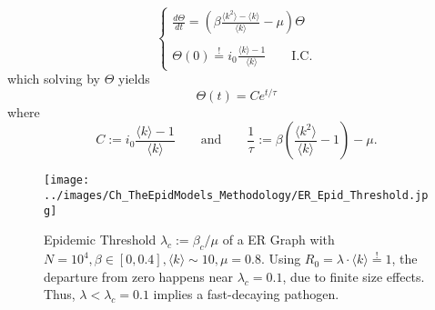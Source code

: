 \documentclass[a4paper,10pt,twoside]{book} %
\theoremstyle{definition}
\begin{document}
\begin{equation}
	\begin{cases}
		\frac{d\Theta}{dt} = \left( \beta\frac{\langle k^2 \rangle - \langle k \rangle}{\langle k \rangle} - \mu \right) \Theta \\ \\
		\Theta(0) \stackrel{!}{=} i_0 \frac{\langle k \rangle -1}{\langle k \rangle } \qquad \text{I.C.}
	\end{cases}
\end{equation}
which solving by $\Theta$ yields 
\begin{equation}
	\Theta(t) = C e^{t/\tau}
	\label{eq:Theta_SIR_network}
\end{equation} 
where
\begin{equation}
	C := i_0\frac{\langle k \rangle -1}{\langle k \rangle}  \qquad \text{and} \qquad
	\frac{1}{\tau} := \beta \left(\frac{\langle k^2 \rangle}{\langle k \rangle}-1\right)
	-\mu.
	\label{eq:tau_SIR_networks}
\end{equation}

\begin{figure}[t]
	\texttt{[image: ../images/Ch\_TheEpidModels\_Methodology/ER\_Epid\_Threshold.jpg]}
	\centering
	\caption{Epidemic Threshold $\lambda_c := \beta_c / \mu$ of a ER Graph with $N = 10^{4}, \beta \in [0,0.4], \langle k \rangle \sim 10, \mu = 0.8$. Using $ R_0 = \lambda \cdot \langle k \rangle \stackrel{!}{=}1$, the departure from zero happens near $\lambda_c = 0.1$, due to finite size effects. Thus, $\lambda < \lambda_c = 0.1$ implies a fast-decaying pathogen.}
	\label{fig:ER_Epidem_Thr}
\end{figure}
\end{document}
